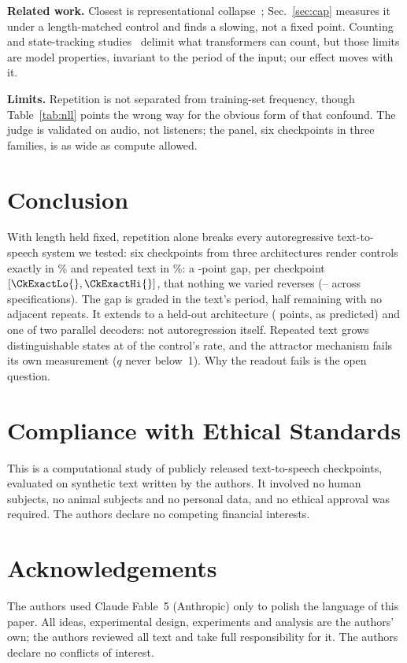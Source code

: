\documentclass{article}
\begin{document}
\textbf{Related work.}
Closest is representational collapse~\cite{barbero2024glasses};
Sec.~\ref{sec:cap} measures it under a length-matched control and finds a
slowing, not a fixed point. Counting and state-tracking
studies~\cite{yehudai2024when,salzer2025counting,zhang2024counting,%
hahn2020theoretical,strobl2024formal,li2025statetracking} delimit what transformers can count, but those limits are model
properties, invariant to the period of the input; our effect moves with
it.

\textbf{Limits.}
Repetition is not separated from training-set
frequency, though Table~\ref{tab:nll} points the wrong way for the
obvious form of that confound. The judge is
validated on audio, not listeners; the panel, six checkpoints in three
families, is as wide as compute allowed.

\section{Conclusion}
\label{sec:conclusion}

With length held fixed, repetition alone breaks every autoregressive
text-to-speech system we tested: six checkpoints from three architectures
render controls exactly in \ExactCtl{}\% and
repeated text in \ExactRep{}\%: a \ARPoolGap{}-point
gap, per checkpoint \CkExact{} $[\CkExactLo{},\CkExactHi{}]$, that
nothing we varied reverses (\SpecLo{}--\SpecHi{} across \SpecN{}
specifications). The gap is graded in the text's period, half
remaining with no adjacent repeats. It extends to a held-out architecture
(\CosyGap{} points, as predicted) and one of two parallel decoders: not
autoregression itself. Repeated text grows distinguishable states at
\CapRatio{} of the control's rate, and the attractor mechanism fails its
own measurement ($q$ never below~1). Why the readout fails is the
open question.

\section*{Compliance with Ethical Standards}
This is a computational study of publicly released text-to-speech
checkpoints, evaluated on synthetic text written by the authors. It
involved no human subjects, no animal subjects and no personal data, and
no ethical approval was required. The authors declare no competing
financial interests.

\section*{Acknowledgements}
The authors used Claude Fable~5 (Anthropic) only to polish the language
of this paper. All ideas, experimental design, experiments and analysis
are the authors' own; the authors reviewed all text and take full
responsibility for it. The authors declare no conflicts of interest.
\end{document}
